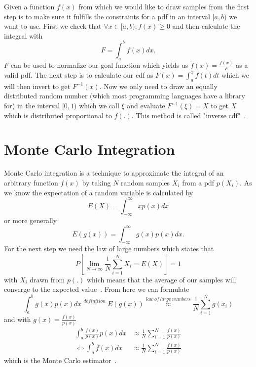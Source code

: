 Given a function $ f(x) $ from which we would like to draw samples from the first step is to make sure
it fulfills the constraints for a pdf in an interval $ [a, b) $ we want to use.
First we check that $ \forall x \in [a, b): f(x) \geq 0 $ and then calculate the integral with
\begin{equation}
\label{eq:integral_fx}
    F = \int_{a}^b f(x) dx.
\end{equation}
$ F $ can be used to normalize our goal function which yields us $ \tilde{f}(x) = \frac{f(x)}{F} $ as a valid pdf.
The next step is to calculate our cdf as $ F(x) = \int_{a}^x \tilde{f}(t) dt $ which we will then invert to get $ F^{-1}(x) $.
Now we only need to draw an equally distributed random number (which most programming languages have a library for) in the interval $ [0, 1) $
which we call $ \xi $ and evaluate $ F^{-1}(\xi) = X $ to get $ X $ which is distributed proportional to $ f(.) $.
This method is called "inverse cdf"~\cite{pris}.



\section{Monte Carlo Integration}
\label{sec:monte_carlo}
Monte Carlo integration is a technique to approximate the integral of an arbitrary function $ f(x) $
by taking $ N $ random samples $ X_i $ from a pdf $ p(X_i) $.
As we know the expectation of a random variable is calculated by $$ E(X) = \int_{-\infty}^\infty x p(x) dx $$
or more generally $$ E(g(x)) = \int_{-\infty}^\infty g(x) p(x) dx. $$
For the next step we need the law of large numbers which states that $$ P\left[ \lim_{N\to\infty} \frac{1}{N} \sum_{i = 1}^N X_i = E(X) \right] = 1 $$
with $ X_i $ drawn from $ p(.) $ which means that the average of our samples will converge to the expected value~\cite[Chapter~2.4.1]{veach-thesis}.
From here we can formulate
\begin{equation*}
    \int_{a}^b g(x) p(x) dx \overset{definition}= E(g(x))
    \overset{law~of~large~numbers}\approx \frac{1}{N} \sum_{i = 1}^N g(x_i)
\end{equation*}
and with $ g(x) = \frac{f(x)}{p(x)} $
\begin{equation}
\label{eq:monte_carlo_integral}
\begin{aligned}
    \int_{a}^b \frac{f(x)}{p(x)} p(x) dx &\approx \frac{1}{N} \sum_{i = 1}^N \frac{f(x)}{p(x)} \\
    \Leftrightarrow \int_{a}^b f(x) dx &\approx \frac{1}{N} \sum_{i = 1}^N \frac{f(x)}{p(x)}
\end{aligned}
\end{equation}
which is the Monte Carlo estimator~\cite{pris}.


